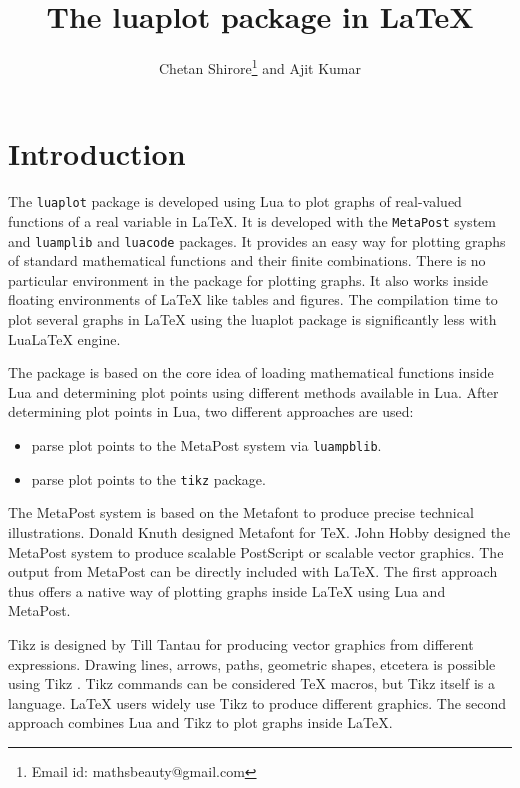 \documentclass{article}
\begin{document}
\title{The luaplot package in LaTeX}
\author{Chetan Shirore\thanks{Email id: mathsbeauty@gmail.com} \space  and Ajit Kumar}
\maketitle

\section{Introduction} 
The \verb|luaplot| package is developed using Lua to plot graphs of real-valued functions of a real variable in LaTeX. It is developed with the  \verb|MetaPost| system  \cite{online.metapost} and \verb|luamplib|  \cite{online.luamplib} and \verb|luacode|  \cite{online.luacode} packages. It provides an easy way for plotting graphs of standard mathematical functions and their finite combinations. There is no particular environment in the package for plotting graphs. It also works inside floating environments of LaTeX like tables and figures. The compilation time to plot several graphs in LaTeX using the luaplot package is significantly less with LuaLaTeX engine.

The package is based on the core idea of loading mathematical functions inside Lua and determining plot points using different methods available in Lua. After determining plot points in Lua, two different approaches are used:
\begin{itemize}
\item parse plot points to the MetaPost system via  \verb|luampblib|.
\item parse plot points to the  \verb|tikz| package.
\end{itemize}

The MetaPost system is based on the Metafont to produce precise technical illustrations. Donald Knuth designed Metafont for TeX. John Hobby designed the MetaPost system to produce scalable PostScript or scalable vector graphics. The output from MetaPost can be directly included with LaTeX. The first approach thus offers a native way of plotting graphs inside LaTeX using Lua and MetaPost.

Tikz is designed by Till Tantau for producing vector graphics from different expressions. Drawing lines, arrows, paths, geometric shapes, etcetera is possible using Tikz \cite{online.pgf}. Tikz commands can be considered TeX macros, but Tikz itself is a language. LaTeX users widely use Tikz to produce different graphics. The second approach combines Lua and Tikz to plot graphs inside LaTeX.
\end{document}
